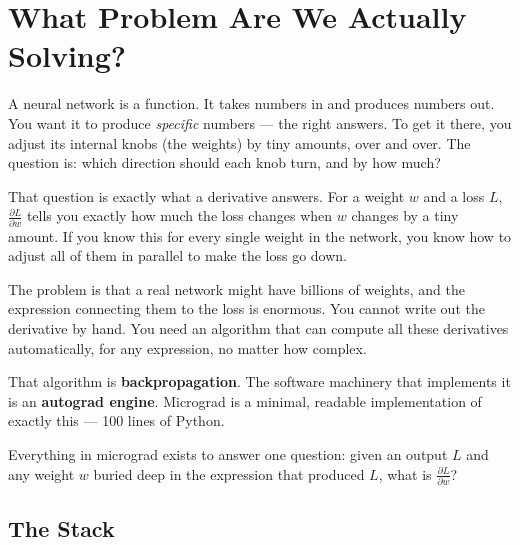 \documentclass[12pt,a4paper]{article}
\begin{document}
\tableofcontents
\newpage

\section{What Problem Are We Actually Solving?}

A neural network is a function. It takes numbers in and produces numbers out. You want it to produce \emph{specific} numbers — the right answers. To get it there, you adjust its internal knobs (the weights) by tiny amounts, over and over. The question is: which direction should each knob turn, and by how much?

That question is exactly what a derivative answers. For a weight $w$ and a loss $L$, $\frac{\partial L}{\partial w}$ tells you exactly how much the loss changes when $w$ changes by a tiny amount. If you know this for every single weight in the network, you know how to adjust all of them in parallel to make the loss go down.

The problem is that a real network might have billions of weights, and the expression connecting them to the loss is enormous. You cannot write out the derivative by hand. You need an algorithm that can compute all these derivatives automatically, for any expression, no matter how complex.

That algorithm is \textbf{backpropagation}. The software machinery that implements it is an \textbf{autograd engine}. Micrograd is a minimal, readable implementation of exactly this — 100 lines of Python.

\begin{stickybox}
Everything in micrograd exists to answer one question: given an output $L$ and any weight $w$ buried deep in the expression that produced $L$, what is $\frac{\partial L}{\partial w}$?
\end{stickybox}

\subsection{The Stack}
\end{document}
